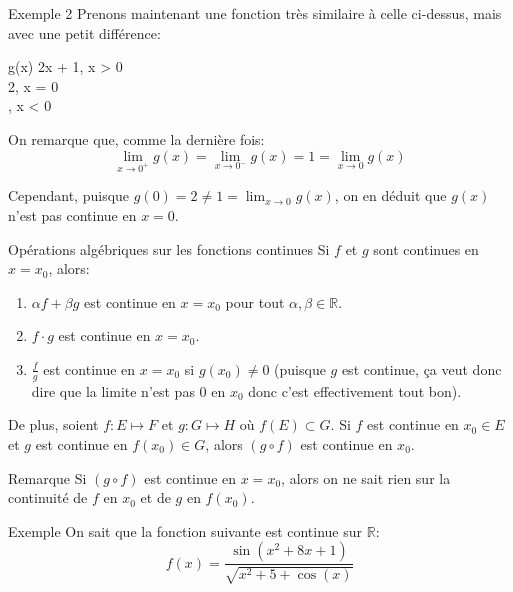 \documentclass[a4paper]{article}
\begin{document}
\begin{parag}{Exemple 2}
    Prenons maintenant une fonction très similaire à celle ci-dessus, mais avec une petit différence: 
    \begin{functionbypart}{g\left(x\right)}
    2x + 1, \mathspace x > 0  \\
    2, \mathspace x = 0 \\
    , \mathspace x < 0
    \end{functionbypart}

    On remarque que, comme la dernière fois: 
    \[\lim_{x \to 0^+} g\left(x\right) = \lim_{x \to 0^-} g\left(x\right) = 1 = \lim_{x \to 0} g\left(x\right)\]

    Cependant, puisque $g\left(0\right) = 2 \neq 1 = \lim_{x \to 0} g\left(x\right)$, on en déduit que $g\left(x\right)$ n'est pas continue en $x = 0$.
    
\end{parag}

\begin{parag}{Opérations algébriques sur les fonctions continues}
    Si $f$ et $g$ sont continues en $x = x_0$, alors:
    \begin{enumerate}
        \item $\alpha f + \beta g$ est continue en $x = x_0$ pour tout $\alpha, \beta \in \mathbb{R}$.
        \item $f\cdot g$ est continue en $x = x_0$.
        \item $\frac{f}{g}$ est continue en $x = x_0$ si $g\left(x_0\right) \neq 0$ (puisque $g$ est continue, ça veut donc dire que la limite n'est pas 0 en $x_0$ donc c'est effectivement tout bon).
    \end{enumerate}

    De plus, soient $f : E\mapsto F$ et $g : G \mapsto H$ où $f\left(E\right) \subset G$. Si $f$ est continue en $x_0 \in E$ et $g$ est continue en $f\left(x_0\right) \in G$, alors $\left(g \circ f\right)$ est continue en $x_0$.

    \begin{subparag}{Remarque}
        Si $\left(g \circ f\right)$ est continue en $x = x_0$, alors on ne sait rien sur la continuité de $f$ en $x_0$ et de $g$ en $f\left(x_0\right)$.
    \end{subparag}
    
\end{parag}

\begin{parag}{Exemple}
    On sait que la fonction suivante est continue sur $\mathbb{R}$: 
    \[f\left(x\right) = \frac{\sin\left(x^2 + 8x + 1\right)}{\sqrt{x^2 + 5 + \cos\left(x\right)}}\]
    
\end{parag}
\end{document}
